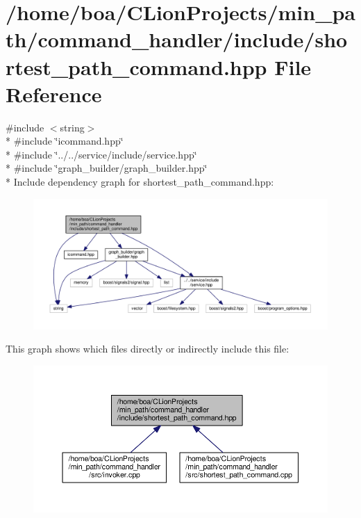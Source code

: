 \hypertarget{a00023}{}\section{/home/boa/\+C\+Lion\+Projects/min\+\_\+path/command\+\_\+handler/include/shortest\+\_\+path\+\_\+command.hpp File Reference}
\label{a00023}
{\ttfamily \#include $<$string$>$}\\*
{\ttfamily \#include \char`\"{}icommand.\+hpp\char`\"{}}\\*
{\ttfamily \#include \char`\"{}../../service/include/service.\+hpp\char`\"{}}\\*
{\ttfamily \#include \char`\"{}graph\+\_\+builder/graph\+\_\+builder.\+hpp\char`\"{}}\\*
Include dependency graph for shortest\+\_\+path\+\_\+command.\+hpp\+:
\nopagebreak
\begin{figure}[H]
\begin{center}
\leavevmode
\includegraphics[width=350pt]{dc/dee/a00053}
\end{center}
\end{figure}
This graph shows which files directly or indirectly include this file\+:
\nopagebreak
\begin{figure}[H]
\begin{center}
\leavevmode
\includegraphics[width=350pt]{d1/dea/a00054}
\end{center}
\end{figure}
